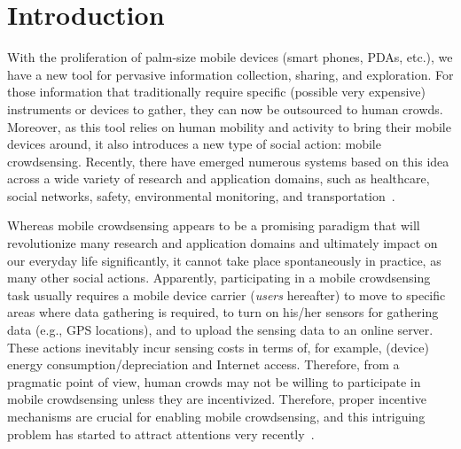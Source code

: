 \documentclass[10pt,journal,compsoc]{IEEEtran}
\begin{document}
\section{Introduction} \label{sec:intro}
With the proliferation of palm-size mobile devices (smart phones, PDAs, etc.), we have a new tool for pervasive information collection, sharing, and exploration. For those information that traditionally require specific (possible very expensive) instruments or devices to gather, they can now be outsourced to human crowds.  Moreover, as this tool relies on human mobility and activity to bring their mobile devices around, it also introduces a new type of social action: mobile crowdsensing. Recently, there have emerged numerous systems based on this idea across a wide variety of research and application domains, such as healthcare, social networks, safety, environmental monitoring, and transportation~\cite{GantiYL2011,Khan2013}.

  Whereas mobile crowdsensing appears to be a promising paradigm that will revolutionize many research and application domains and ultimately impact on our everyday life significantly, it cannot take place spontaneously in practice, as many other social actions. Apparently, participating in a mobile crowdsensing task usually requires a mobile device carrier (\textit{users} hereafter) to move to specific areas where data gathering is required, to turn on his/her sensors for gathering data (e.g., GPS locations), and to upload the sensing data to an online server. These actions inevitably incur sensing costs in terms of, for example, (device) energy consumption/depreciation and Internet access. Therefore, from a pragmatic point of view, human crowds may not be willing to participate in mobile crowdsensing unless they are incentivized. Therefore, proper incentive mechanisms are crucial for enabling mobile crowdsensing, and this intriguing problem has started to attract attentions very recently~\cite{Lee2010,Jaimes2012,Duan2012,Yang2012,Qinghua2013}.
\end{document}
